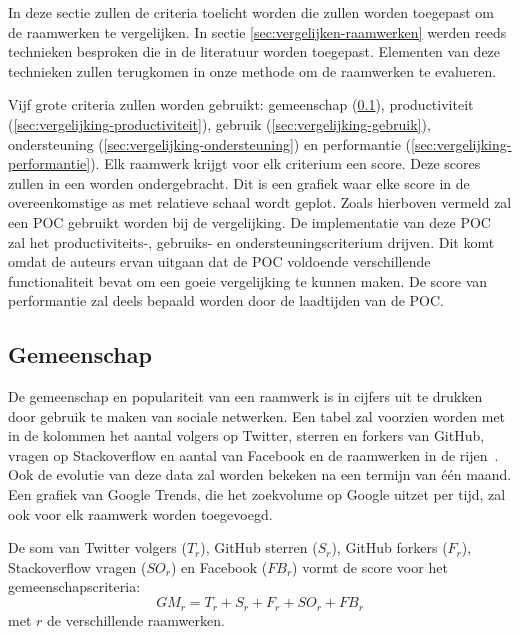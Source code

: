 In deze sectie zullen de criteria toelicht worden die zullen worden toegepast om de raamwerken te vergelijken.
In sectie \ref{sec:vergelijken-raamwerken} werden reeds technieken besproken die in de literatuur worden toegepast.
Elementen van deze technieken zullen terugkomen in onze methode om de raamwerken te evalueren.


Vijf grote criteria zullen worden gebruikt: gemeenschap (\ref{sec:vergelijking-gemeenschap}), productiviteit (\ref{sec:vergelijking-productiviteit}), gebruik (\ref{sec:vergelijking-gebruik}), ondersteuning (\ref{sec:vergelijking-ondersteuning}) en performantie (\ref{sec:vergelijking-performantie}). 
Elk raamwerk krijgt voor elk criterium een score. 
Deze scores zullen in een  worden ondergebracht.
Dit is een grafiek waar elke score in de overeenkomstige as met relatieve schaal wordt geplot.
Zoals hierboven vermeld zal een POC gebruikt worden bij de vergelijking.
De implementatie van deze POC zal het productiviteits-, gebruiks- en ondersteuningscriterium drijven.  
Dit komt omdat de auteurs ervan uitgaan dat de POC voldoende verschillende functionaliteit bevat om een goeie vergelijking te kunnen maken.
De score van performantie zal deels bepaald worden door de laadtijden van de POC.

\subsection{Gemeenschap}
\label{sec:vergelijking-gemeenschap}
De gemeenschap en populariteit van een raamwerk is in cijfers uit te drukken door gebruik te maken van sociale netwerken. 
Een tabel zal voorzien worden met in de kolommen het aantal volgers op Twitter, sterren en forkers van GitHub,  vragen op Stackoverflow en aantal  van Facebook en de raamwerken in de rijen~\cite{Sarrafi2012a,Ayuso2012}. 
Ook de evolutie van deze data zal worden bekeken na een termijn van één maand.
Een grafiek van Google Trends, die het zoekvolume op Google uitzet per tijd, zal ook voor elk raamwerk worden toegevoegd.

De som van Twitter volgers ($T_r$), GitHub sterren ($S_r$), GitHub forkers ($F_r$), Stackoverflow vragen ($SO_r$) en Facebook  ($FB_r$) vormt de score voor het gemeenschapscriteria:
\begin{equation}
  GM_r=T_r+S_r+F_r+SO_r+FB_r
  \label{eq:gemeenschap}
\end{equation}
met $r$ de verschillende raamwerken.

